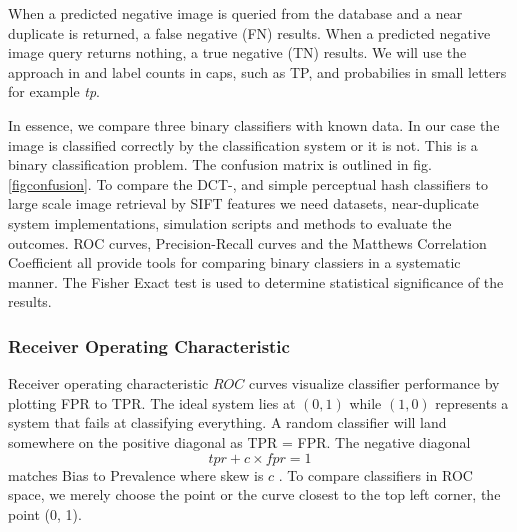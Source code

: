\documentclass[english,12pt,a4paper,pdftex,elec,utf8, table]{aaltothesis}
\begin{document}
When a predicted negative image is queried from the database and a near duplicate is returned, a false negative (FN) results. When a predicted negative image query returns nothing, a true negative (TN) results. We will use the approach in \cite{POWERS2011} and label counts in caps, such as TP, and probabilies in small letters for example \emph{tp}.

In essence, we compare three binary classifiers with known data. In our case the image is classified correctly by the classification system or it is not. This is a binary classification problem. The confusion matrix is outlined in fig. \ref{figconfusion}. To compare the DCT-, and simple perceptual hash classifiers to large scale image retrieval by SIFT features we need datasets, near-duplicate system implementations, simulation scripts and methods to evaluate the outcomes. ROC curves, Precision-Recall curves and the Matthews Correlation Coefficient all provide tools for comparing binary classiers in a systematic manner. The Fisher Exact test is used to determine statistical significance of the results.

\subsubsection{Receiver Operating Characteristic}\label{ROCSection}
Receiver operating characteristic \(ROC\) curves visualize classifier performance by plotting FPR to TPR. The ideal system lies at $(0, 1)$ while $(1, 0)$ represents a system that fails at classifying everything. A random classifier will land somewhere on the positive diagonal as TPR = FPR. The negative diagonal
\begin{equation}\label{biastoprevalence}
tpr + c\times fpr=1
\end{equation}
matches Bias to Prevalence where skew is $c$ \cite{POWERS2011}. To compare classifiers in ROC space, we merely choose the point or the curve closest to the top left corner, the point (0, 1).
\end{document}

